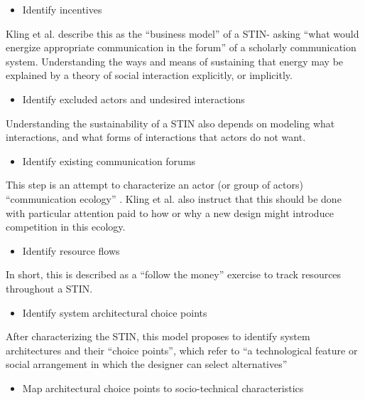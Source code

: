 \begin{itemize}
\itemsep1pt\parskip0pt
\item
  Identify incentives
\end{itemize}

Kling et al. describe this as the ``business model'' of a STIN- asking
``what would energize appropriate communication in the forum'' of a
scholarly communication system. Understanding the ways and means of
sustaining that energy may be explained by a theory of social
interaction explicitly, or implicitly.

\begin{itemize}
\itemsep1pt\parskip0pt
\item
  Identify excluded actors and undesired interactions
\end{itemize}

Understanding the sustainability of a STIN also depends on modeling what
interactions, and what forms of interactions that actors do not want.

\begin{itemize}
\itemsep1pt\parskip0pt
\item
  Identify existing communication forums
\end{itemize}

This step is an attempt to characterize an actor (or group of actors)
``communication ecology'' . Kling et al. also instruct that this should
be done with particular attention paid to how or why a new design might
introduce competition in this ecology.

\begin{itemize}
\itemsep1pt\parskip0pt
\item
  Identify resource flows
\end{itemize}

In short, this is described as a ``follow the money'' exercise to track
resources throughout a STIN.

\begin{itemize}
\itemsep1pt\parskip0pt
\item
  Identify system architectural choice points
\end{itemize}

After characterizing the STIN, this model proposes to identify system
architectures and their ``choice points'', which refer to ``a
technological feature or social arrangement in which the designer can
select alternatives''

\begin{itemize}
\itemsep1pt\parskip0pt
\item
  Map architectural choice points to socio-technical characteristics
\end{itemize}

